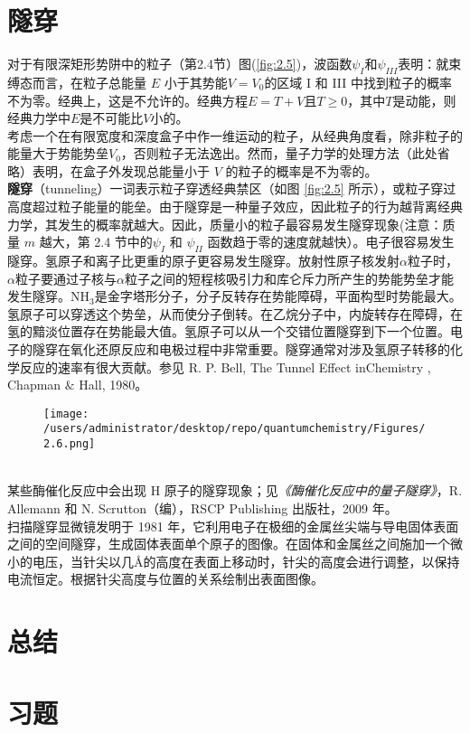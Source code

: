 \section{隧穿}
	对于有限深矩形势阱中的粒子（第2.4节）图(\ref{fig:2.5})，波函数$\psi_I$和$\psi_{III}$表明：就束缚态而言，在粒子总能量 $E$ 小于其势能$V=V_0$的区域 I 和 III 中找到粒子的概率不为零。经典上，这是不允许的。经典方程$E=T+V$且$T \ge 0$，其中$T$是动能，则经典力学中$E$是不可能比$V$小的。\\
	\indent 考虑一个在有限宽度和深度盒子中作一维运动的粒子，从经典角度看，除非粒子的能量大于势能势垒$V_0$，否则粒子无法逸出。然而，量子力学的处理方法（此处省略）表明，在盒子外发现总能量小于 $V$ 的粒子的概率是不为零的。\\
	\indent \textbf{隧穿}（tunneling）一词表示粒子穿透经典禁区（如图 \ref{fig:2.5} 所示），或粒子穿过高度超过粒子能量的能垒。由于隧穿是一种量子效应，因此粒子的行为越背离经典力学，其发生的概率就越大。因此，质量小的粒子最容易发生隧穿现象(注意：质量 $m$ 越大，第 2.4 节中的$\psi_I$ 和 $\psi_{II}$ 函数趋于零的速度就越快）。电子很容易发生隧穿。氢原子和离子比更重的原子更容易发生隧穿。放射性原子核发射$\alpha$粒子时，$\alpha$粒子要通过子核与$\alpha$粒子之间的短程核吸引力和库仑斥力所产生的势能势垒才能发生隧穿。$\mathrm{NH_3}$是金字塔形分子，分子反转存在势能障碍，平面构型时势能最大。氢原子可以穿透这个势垒，从而使分子倒转。在乙烷分子中，内旋转存在障碍，在氢的黯淡位置存在势能最大值。氢原子可以从一个交错位置隧穿到下一个位置。电子的隧穿在氧化还原反应和电极过程中非常重要。隧穿通常对涉及氢原子转移的化学反应的速率有很大贡献。参见 R. P. Bell, The Tunnel Effect inChemistry , Chapman $\&$ Hall, 1980。
		\begin{figure}[h!]
		\centering
		\texttt{[image: /users/administrator/desktop/repo/quantumchemistry/Figures/2.6.png]}  %
		\caption{}
		\label{fig:2.6}
	\end{figure}
	\\
	\indent 某些酶催化反应中会出现 H 原子的隧穿现象；见\textit{《酶催化反应中的量子隧穿》}，R. Allemann 和 N. Scrutton（编），RSCP Publishing 出版社，2009 年。\\
	\indent  扫描隧穿显微镜发明于 1981 年，它利用电子在极细的金属丝尖端与导电固体表面之间的空间隧穿，生成固体表面单个原子的图像。在固体和金属丝之间施加一个微小的电压，当针尖以几\AA 的高度在表面上移动时，针尖的高度会进行调整，以保持电流恒定。根据针尖高度与位置的关系绘制出表面图像。
	
	
	
	
	
	
	

\section*{总结}

\section*{习题}
